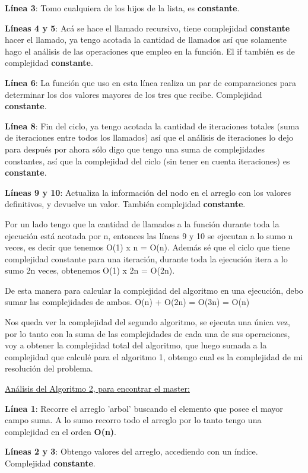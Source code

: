 \textbf{Línea 3}: Tomo cualquiera de los hijos de la lista, es \textbf{constante}.

\textbf{Líneas 4 y 5}: Acá se hace el llamado recursivo, tiene complejidad \textbf{constante} hacer el llamado, ya tengo acotada la cantidad de llamados así que solamente hago el análisis de las operaciones que empleo en la función. El if también es de complejidad \textbf{constante}.

\textbf{Línea 6}: La función que uso en esta línea realiza un par de comparaciones para determinar los dos valores mayores de los tres que recibe. Complejidad \textbf{constante}.

\textbf{Línea 8}: Fin del ciclo, ya tengo acotada la cantidad de iteraciones totales (suma de iteraciones entre todos los llamados) así que el análisis de iteraciones lo dejo para después por ahora sólo digo que tengo una suma de complejidades constantes, así que la complejidad del ciclo (sin tener en cuenta iteraciones) es\textbf{ constante}.

\textbf{Líneas 9 y 10}: Actualiza la información del nodo en el arreglo con los valores definitivos, y devuelve un valor. También complejidad \textbf{constante}.

Por un lado tengo que la cantidad de llamados a la función durante toda la ejecución está acotada por n, entonces las líneas 9 y 10 se ejecutan a lo sumo n veces, es decir que tenemos O(1) x n = O(n).
Además sé que el ciclo que tiene complejidad constante para una iteración, durante toda la ejecución itera a lo sumo 2n veces, obtenemos O(1) x 2n = O(2n).


De esta manera para calcular la complejidad del algoritmo en una ejecución, debo sumar las complejidades de ambos. O(n) + O(2n) = O(3n) = O(n)

Nos queda ver la complejidad del segundo algoritmo, se ejecuta una única vez, por lo tanto con la suma de las complejidades de cada una de sus operaciones, voy a obtener la complejidad total del algoritmo, que luego sumada a la complejidad que calculé para el algoritmo 1, obtengo cual es la complejidad de mi resolución del problema.

\underline{Análisis del Algoritmo 2, para encontrar el master:}

\textbf{Línea 1}: Recorre el arreglo 'arbol' buscando el elemento que posee el mayor campo suma. A lo sumo recorro todo el arreglo por lo tanto tengo una complejidad en el orden \textbf{O(n)}.

\textbf{Líneas 2 y 3}: Obtengo valores del arreglo, accediendo con un índice. Complejidad \textbf{constante}.

